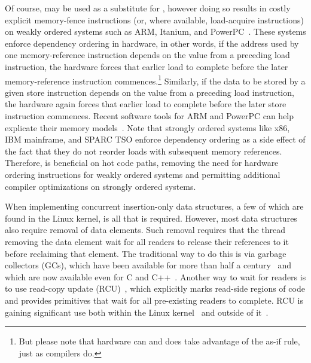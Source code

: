 \documentclass[letterpaper,twocolumn,10pt]{article}
\begin{document}
Of course,  may be used as a substitute for
, however doing so results in costly
explicit memory-fence instructions (or, where available, load-acquire
instructions) on weakly ordered systems such as ARM, Itanium, and
PowerPC~\cite{ARMv7A:2010,ARMv8Litmus2009,IntelItaniumMemoryOrdering2002,PowerISA2.07-2013}.
These systems enforce dependency ordering in hardware, in other words,
if the address used by one memory-reference instruction depends on the
value from a preceding load instruction, the hardware forces that
earlier load to complete before the later memory-reference instruction
commences.\footnote{
	But please note that hardware can and does take advantage
	of the as-if rule, just as compilers do.}
Similarly, if the data to be stored by a given store instruction depends
on the value from a preceding load instruction, the hardware again
forces that earlier load to complete before the later store instruction
commences.
Recent software tools for ARM and PowerPC can help explicate their
memory models~\cite{JadeAlglave2011ppcmem,Alglave:2014:HCM:2594291.2594347,PaulEMcKenney2011ppcmem,PaulEMcKenney2014weakaxiom}.
Note that strongly ordered systems like x86, IBM mainframe, and
SPARC TSO enforce dependency ordering as a side effect of the
fact that they do not reorder loads with subsequent memory references.
Therefore,  is beneficial on hot code paths,
removing the need for hardware ordering instructions for weakly ordered
systems and permitting additional compiler optimizations on
strongly ordered systems.

When implementing concurrent insertion-only data structures, a few of which are
found in the Linux kernel, 
 is all that is required.
However, most data structures also require removal of data elements.
Such removal requires that the thread removing the data element wait for all
readers to release their references to it before reclaiming that element.
The traditional way to do this is via garbage collectors (GCs), which
have been available for more than half a
century~\cite{McCarthy:1960:RFS:367177.367199}
and which are now available even for
C and C++~\cite{Boehm:2004:SEC:989393.989442}.
Another way to wait for readers is to use read-copy update
(RCU)~\cite{McKenney:2013:SDS:2483852.2483867,McKenney98},
which explicitly marks read-side regions of code and provides
primitives that wait for all pre-existing readers to complete.
RCU is gaining significant use both within the
Linux kernel~\cite{PaulEMcKenneyRCUusageRawDataPage}
and outside of it~\cite{MikeDay2013RCUqemu,MichaelDaltonPhD2009,MathieuDesnoyers2012URCU,HariKannan2009DynamicAnalysisRCU,GuillermoVigueras2012RCUCrowd}.
\end{document}
